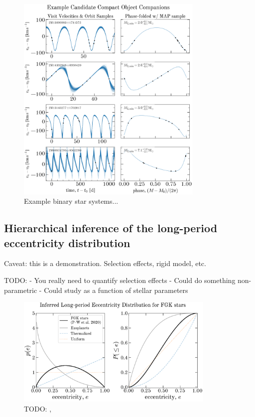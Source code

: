 \documentclass[modern]{aastex63}
\begin{document}
\begin{figure}[!t]
    \begin{center}
    \includegraphics[width=0.8\textwidth]{example-compact-objects-placeholder.png}
    \end{center}
    \caption{%
    Example binary star systems...
    \label{fig:compact-objects}
    }
\end{figure}


\subsection{Hierarchical inference of the long-period eccentricity distribution}
\label{sec:hierarch-ecc}

Caveat: this is a demonstration. Selection effects, rigid model, etc.

TODO:
- You really need to quantify selection effects
- Could do something non-parametric
- Could study as a function of stellar parameters

\begin{figure}[!t]
    \begin{center}
    \includegraphics[width=0.85\textwidth]{eccentricity-distr.pdf}
    \end{center}
    \caption{%
    TODO: \citep{Kipping:2013}, \citep{Jeans:1919}
    \label{fig:eccdist}
    }
\end{figure}
\end{document}
